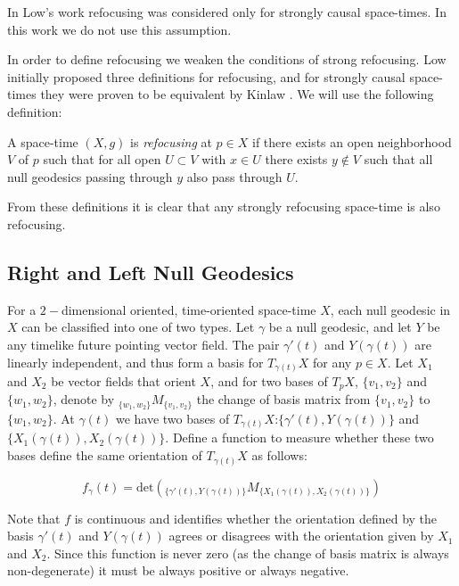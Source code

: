 \begin{rem}
In Low's work refocusing was considered only for strongly causal space-times.  In this work we do not use this assumption.
\end{rem}

In order to define refocusing we weaken the conditions of strong refocusing.  Low initially proposed three definitions for refocusing, and for strongly causal space-times they were proven to be equivalent by Kinlaw \cite{Kinlaw}.  We will use the following definition:
\begin{defin} \label{refoc}
A space-time $(X, g)$ is \emph{refocusing} at $p\in X$ if there exists an open neighborhood $V$ of $p$ such that for all open $U\subset V$ with $x\in U$ there exists $y\notin V$ such that all null geodesics passing through $y$ also pass through $U$.
\end{defin}

From these definitions it is clear that any strongly refocusing space-time is also refocusing.


\subsection{Right and Left Null Geodesics}
For a $2-$dimensional oriented, time-oriented space-time $X$, each null geodesic in $X$ can be classified into one of two types.  Let $\gamma$ be a null geodesic, and let $Y$ be any timelike future pointing vector field.  The pair $\gamma '(t)$ and $Y(\gamma(t))$ are linearly independent, and thus form a basis for $T_{\gamma(t)}X$ for any $p\in X$. Let $X_1$ and $X_2$ be vector fields that orient $X$, and for two bases of $T_p X$, $\{v_1, v_2\}$ and $\{w_1, w_2\}$, denote by $_{\{w_1, w_2\}}M_{\{v_1, v_2\}}$ the change of basis matrix from $\{v_1, v_2\}$ to $\{w_1, w_2\}$.  At $\gamma(t)$ we have two bases of $T_{\gamma(t)} X$:$\{\gamma '(t), Y(\gamma(t))\}$ and $\{X_1(\gamma(t)), X_2(\gamma(t))\}$.  Define a function to measure whether these two bases define the same orientation of $T_{\gamma(t)} X$ as follows:

$$f_\gamma(t) = \mbox{det}\left( _{\{\gamma '(t), Y(\gamma(t))\}}M_{\{X_1(\gamma(t)), X_2(\gamma(t))\}} \right)$$

Note that $f$ is continuous and identifies whether the orientation defined by the basis $\gamma '(t)$ and $Y(\gamma(t))$  agrees or disagrees with the orientation given by $X_1$ and $X_2$.  Since this function is never zero (as the change of basis matrix is always non-degenerate) it must be always positive or always negative.  

